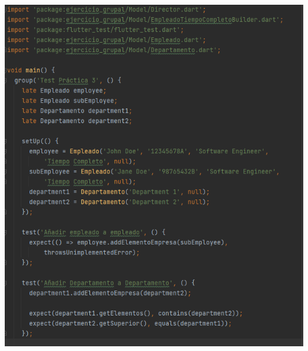 \documentclass[openany]{article}
\begin{document}
\includegraphics[width=6.26772in,height=7.18056in]{imagenes/testGrupo1.png}
\end{document}
